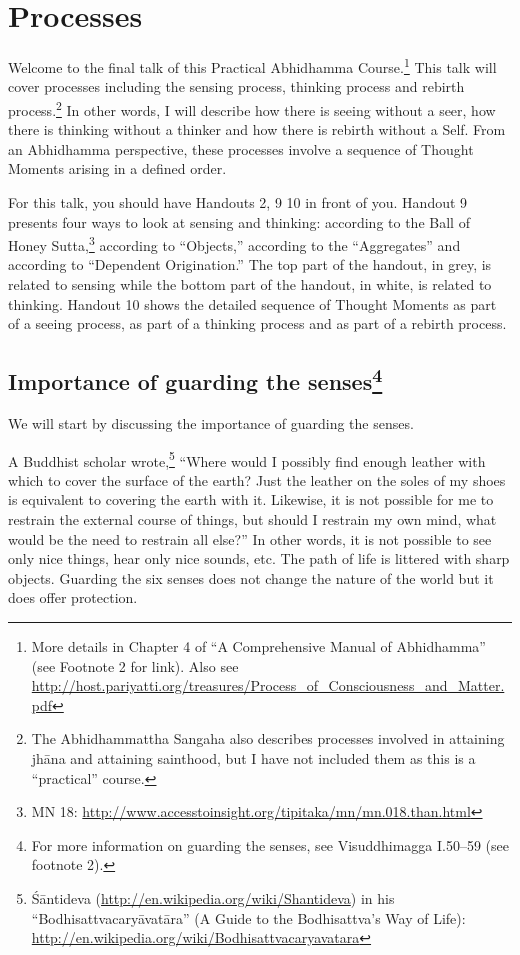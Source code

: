 \section{Processes}

Welcome to the final talk of this Practical Abhidhamma Course.\footnote{More details in Chapter 4 of “A Comprehensive Manual of Abhidhamma” (see Footnote 2 for link). \newline Also see \url{http://host.pariyatti.org/treasures/Process_of_Consciousness_and_Matter.pdf}} This talk will cover processes including the sensing process, thinking process and rebirth process.\footnote{The Abhidhammattha Sangaha also describes processes involved in attaining jhāna and attaining sainthood, but I have not included them as this is a “practical” course.} In other words, I will describe how there is seeing without a seer, how there is thinking without a thinker and how there is rebirth without a Self. From an Abhidhamma perspective, these processes involve a sequence of Thought Moments arising in a defined order.

For this talk, you should have Handouts 2, 9 10 in front of you. Handout 9 presents four ways to look at sensing and thinking: according to the Ball of Honey Sutta,\footnote{MN 18: \url{http://www.accesstoinsight.org/tipitaka/mn/mn.018.than.html}} according to “Objects,” according to the “Aggregates” and according to “Dependent Origination.” The top part of the handout, in grey, is related to sensing while the bottom part of the handout, in white, is related to thinking. Handout 10 shows the detailed sequence of Thought Moments as part of a seeing process, as part of a thinking process and as part of a rebirth process.

\subsection*{Importance of guarding the senses\footnote{For more information on guarding the senses, see Visuddhimagga I.50--59 (see footnote 2).}}

We will start by discussing the importance of guarding the senses.

A Buddhist scholar wrote,\footnote{Śāntideva (\url{http://en.wikipedia.org/wiki/Shantideva}) in his “Bodhisattvacaryāvatāra” (A Guide to the Bodhisattva’s Way of Life): \url{http://en.wikipedia.org/wiki/Bodhisattvacaryavatara}} “Where would I possibly find enough leather with which to cover the surface of the earth? Just the leather on the soles of my shoes is equivalent to covering the earth with it. Likewise, it is not possible for me to restrain the external course of things, but should I restrain my own mind, what would be the need to restrain all else?” In other words, it is not possible to see only nice things, hear only nice sounds, etc. The path of life is littered with sharp objects. Guarding the six senses does not change the nature of the world but it does offer protection.

